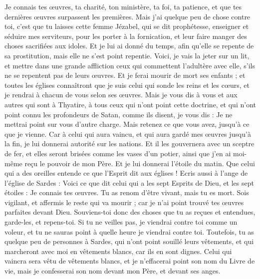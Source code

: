 \begin{multicols}{2}
Je connais tes œuvres, ta charité, ton ministère, ta foi, ta patience, et que tes dernières œuvres surpassent les premières.
Mais j'ai quelque peu de chose contre toi, c'est que tu laisses cette femme Jézabel, qui se dit prophétesse, enseigner et séduire mes serviteurs, pour les porter à la fornication, et leur faire manger des choses sacrifiées aux idoles.
Et je lui ai donné du temps, afin qu'elle se repente de sa prostitution, mais elle ne s'est point repentie.
Voici, je vais la jeter sur un lit, et mettre dans une grande affliction ceux qui commettent l'adultère avec elle, s'ils ne se repentent pas de leurs œuvres.
Et je ferai mourir de mort ses enfants ; et toutes les églises connaîtront que je suis celui qui sonde les reins et les cœurs, et je rendrai à chacun de vous selon ses œuvres.
Mais je vous dis à vous et aux autres qui sont à Thyatire, à tous ceux qui n'ont point cette doctrine, et qui n'ont point connu les profondeurs de Satan, comme ils disent, je vous dis : Je ne mettrai point sur vous d'autre charge.
Mais retenez ce que vous avez, jusqu'à ce que je vienne.
Car à celui qui aura vaincu, et qui aura gardé mes œuvres jusqu'à la fin, je lui donnerai autorité sur les nations.
Et il les gouvernera avec un sceptre de fer, et elles seront brisées comme les vases d'un potier, ainsi que j'en ai moi-même reçu le pouvoir de mon Père.
Et je lui donnerai l'étoile du matin.
Que celui qui a des oreilles entende ce que l'Esprit dit aux églises !
\VerseOne{}Ecris aussi à l'ange de l'église de Sardes : Voici ce que dit celui qui a les sept Esprits de Dieu, et les sept étoiles : Je connais tes œuvres. Tu as renom d'être vivant, mais tu es mort.
Sois vigilant, et affermis le reste qui va mourir ; car je n'ai point trouvé tes œuvres parfaites devant Dieu.
Souviens-toi donc des choses que tu as reçues et entendues, garde-les, et repens-toi. Si tu ne veilles pas, je viendrai contre toi comme un voleur, et tu ne sauras point à quelle heure je viendrai contre toi.
Toutefois, tu as quelque peu de personnes à Sardes, qui n'ont point souillé leurs vêtements, et qui marcheront avec moi en vêtements blancs, car ils en sont dignes.
Celui qui vaincra sera vêtu de vêtements blancs, et je n'effacerai point son nom du Livre de vie, mais je confesserai son nom devant mon Père, et devant ses anges.

\end{multicols}
